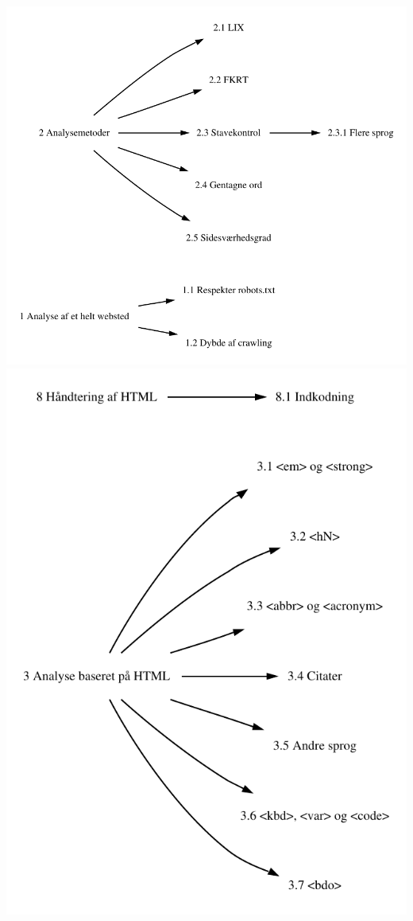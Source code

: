 \documentclass[a4paper,oneside,article, titlepage]{article}
\begin{document}
\includegraphics{kravill1.pdf}
\newpage
\includegraphics{kravill2.pdf}
\end{document}
